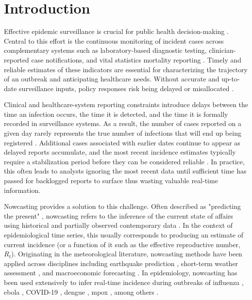 \documentclass[12pt]{article}
\begin{document}
\section{Introduction}

Effective epidemic surveillance is crucial for public health decision-making \cite{world2023future, shen2025progress}. Central to this effort is the continuous monitoring of incident cases across complementary systems such as laboratory-based diagnostic testing, clinician-reported case notifications, and vital statistics mortality reporting \cite{ibrahim2020epidemiologic}. Timely and reliable estimates of these indicators are essential for characterizing the trajectory of an outbreak and anticipating healthcare needs. Without accurate and up-to-date surveillance inputs, policy responses risk being delayed or misallocated \cite{shen2025progress, villela2022importance}.

Clinical and healthcare-system reporting constraints introduce delays between the time an infection occurs, the time it is detected, and the time it is formally recorded in surveillance systems. As a result, the number of cases reported on a given day rarely represents the true number of infections that will end up being registered \cite{jajosky2004evaluation, swaan2018timeliness, marinovic2015quantifying}. Additional cases associated with earlier dates continue to appear as delayed reports accumulate, and the most recent incidence estimates typically require a stabilization period before they can be considered reliable \cite{center2004morbidity}. In practice, this often leads to analysts ignoring the most recent data until sufficient time has passed for backlogged reports to surface thus wasting valuable real-time information.

Nowcasting provides a solution to this challenge. Often described as "predicting the present" \cite{scott2014predicting}, nowcasting refers to the inference of the current state of affairs using historical and partially observed contemporary data \cite{wu2021nowcasting}. In the context of epidemiological time series, this usually corresponds to producing an estimate of current incidence (or a function of it such as the effective reproductive number, $R_t$). Originating in the meteorological literature, nowcasting methods have been applied across disciplines including earthquake prediction \cite{rundle2016nowcasting}, short-term weather assessment \cite{camporeale2019challenge}, and macroeconomic forecasting \cite{bok2018macroeconomic}. In epidemiology, nowcasting has been used extensively to infer real-time incidence during outbreaks of influenza \cite{he2022nowcasting, preis2014adaptive, spreco2018evaluation}, ebola \cite{tariq2025nowcast}, COVID-19 \cite{greene2021nowcasting, birrell2021real, albani2022nowcasting}, dengue \cite{codeco2018infodengue, mcgough2020nowcasting}, mpox \cite{charniga2024nowcasting, rohrer2025nowcasting}, among others \cite{mellor2025application, menkir2021nowcasting}.
\end{document}
